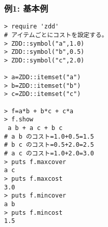 \subsubsection*{例1: 基本例}



\begin{Verbatim}[baselinestretch=0.7,frame=single]
> require 'zdd'
# アイテムごとにコストを設定する。
> ZDD::symbol("a",1.0)
> ZDD::symbol("b",0.5)
> ZDD::symbol("c",2.0)

> a=ZDD::itemset("a")
> b=ZDD::itemset("b")
> c=ZDD::itemset("c")

> f=a*b + b*c + c*a
> f.show
 a b + a c + b c
# a b のコスト=1.0+0.5=1.5
# b c のコスト=0.5+2.0=2.5
# a c のコスト=1.0+2.0=3.0
> puts f.maxcover
a c
> puts f.maxcost
3.0
> puts f.mincover
a b
> puts f.mincost
1.5
\end{Verbatim}
